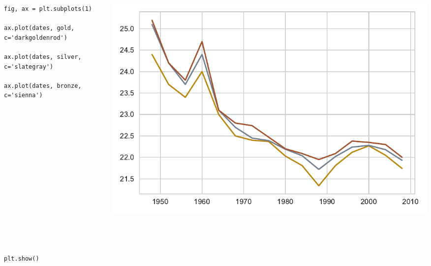 \documentclass{beamer}
\begin{document}
\begin{frame}[fragile]
\tiny{
\begin{columns}
\begin{column}{0.45\textwidth}
\begin{verbatim}
fig, ax = plt.subplots(1)

ax.plot(dates, gold, c='darkgoldenrod')

ax.plot(dates, silver, c='slategray')

ax.plot(dates, bronze, c='sienna')
















plt.show()
\end{verbatim}
\end{column}
\begin{column}{0.55\textwidth}
\includegraphics[width=\textwidth]{olympics_2.pdf}
\end{column}
\end{columns}
}
\end{frame}
\end{document}

